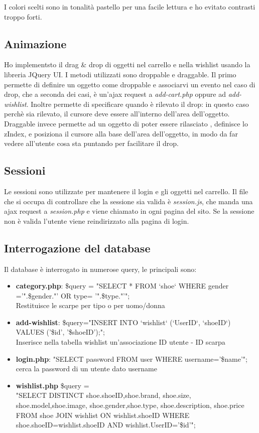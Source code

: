 \documentclass[a4paper,12pt]{article}
\begin{document}
I colori scelti sono in tonalità pastello per una facile lettura e ho evitato contrasti troppo forti.

\subsection{Animazione}
Ho implementsto il drag \& drop di oggetti nel carrello e nella wishlist usando
la libreria JQuery UI. I metodi utilizzati sono droppable e draggable.
Il primo permette di definire un oggetto come droppable e associarvi un evento nel caso di drop, che a seconda dei casi,
è un'ajax request a \textit{add-cart.php} oppure ad \textit{add-wishlist}. Inoltre permette di specificare
quando è rilevato il drop: in questo caso perchè sia rilevato,  il cursore deve essere all'interno
dell'area dell'oggetto. Draggable invece permette ad un oggetto di poter essere rilasciato
, definisce  lo zIndex, e posiziona il cursore alla base dell'area dell'oggetto, in modo da far vedere
all'utente cosa sta puntando per facilitare il drop.

\subsection{Sessioni}
Le sessioni sono utilizzate per mantenere il login e gli oggetti nel carrello. Il file che si occupa di controllare
che la sessione sia valida è \textit{session.js}, che manda una ajax request a \textit{session.php} e viene chiamato
in ogni pagina del sito. Se la sessione non è valida l'utente viene reindirizzato alla pagina di login.

\subsection{Interrogazione del database}
Il database è interrogato in numerose query, le principali sono:

\begin{itemize}
	\item \textbf{category.php}:  \$query = "SELECT * FROM `shoe` WHERE gender ='".\$gender."' OR type= '".\$type."'";
	      \\ Restituisce le scarpe per tipo o per uomo/donna
	\item \textbf{add-wishlist}:  \$query="INSERT INTO `wishlist` (`UserID`, `shoeID`) VALUES ('\$id', '\$shoeID');";
	      \\ Inserisce nella tabella wishlist un'associazione ID utente - ID scarpa
	\item \textbf{login.php}:
	      "SELECT password FROM user WHERE username='\$name'";
	      \\ cerca la password di un utente dato username
	\item \textbf{wishlist.php} \$query =
	      \\"SELECT DISTINCT shoe.shoeID,shoe.brand, shoe.size, shoe.model,shoe.image, shoe.gender,shoe.type, shoe.description, shoe.price FROM shoe JOIN wishlist ON wishlist.shoeID WHERE shoe.shoeID=wishlist.shoeID AND wishlist.UserID='\$id'";
\end{itemize}
\end{document}
